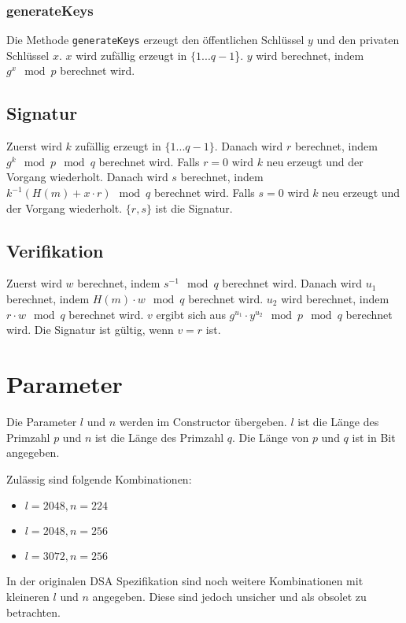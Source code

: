 \subsubsection{generateKeys}
Die Methode \texttt{generateKeys} erzeugt den öffentlichen Schlüssel $y$ und den privaten Schlüssel $x$. $x$ wird zufällig erzeugt in $\{1 ... q-1$\}. $y$ wird berechnet, indem $g^x \mod p$ berechnet wird.

\subsection{Signatur}
Zuerst wird $k$ zufällig erzeugt in $\{1 ... q-1\}$. Danach wird $r$ berechnet, indem $g^k \mod p \mod q$ berechnet wird. Falls $r = 0$ wird $k$ neu erzeugt und der Vorgang wiederholt. Danach wird $s$ berechnet, indem $k^{-1} (H(m) + x \cdot r) \mod q$ berechnet wird. Falls $s = 0$ wird $k$ neu erzeugt und der Vorgang wiederholt. $\{ r , s \}$ ist die Signatur.

\subsection{Verifikation}
Zuerst wird $w$ berechnet, indem $s^{-1} \mod q$ berechnet wird. Danach wird $u_1$ berechnet, indem $H(m) \cdot w \mod q$ berechnet wird. $u_2$ wird berechnet, indem $r \cdot w \mod q$ berechnet wird. $v$ ergibt sich aus $g^{u_1} \cdot y^{u_2} \mod p \mod q$ berechnet wird. Die Signatur ist gültig, wenn $v = r$ ist.

\section{Parameter}
Die Parameter $l$ und $n$ werden im Constructor übergeben. $l$ ist die Länge des Primzahl $p$ und $n$ ist die Länge des Primzahl $q$. Die Länge von $p$ und $q$ ist in Bit angegeben.

Zulässig sind folgende Kombinationen:
\begin{itemize}
    \item $l = 2048, n = 224$
    \item $l = 2048, n = 256$
    \item $l = 3072, n = 256$
\end{itemize}

In der originalen DSA Spezifikation sind noch weitere Kombinationen mit kleineren $l$ und $n$ angegeben. Diese sind jedoch unsicher und als obsolet zu betrachten.

